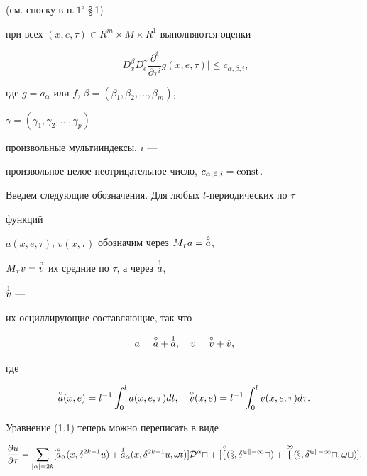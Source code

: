 (см. сноску в п.\,$1^\circ$ \S\,1) 


при всех $(x,e,\tau)\in R^m\times M\times R^1$ выполняются оценки 


\begin{equation} 


\bigg|D^\beta_x D^\gamma_e 


\frac{\partial^i}{\partial\tau^i}g(x,e,\tau)\bigg| 


\le c_{\alpha,\beta,i}, 


\end{equation} 


где $g=a_\alpha$ или $f$, $\beta=(\beta_1,\beta_2,\dotsc,\beta_m)$, 


$\gamma=(\gamma_1,\gamma_2,\dotsc,\gamma_p)$ --- 


произвольные мультииндексы, $i$ --- 


произвольное целое неотрицательное число, $c_{\alpha,\beta,i}=\operatorname{const}$. 


 


Введем следующие обозначения. Для любых $l$-периодических по $\tau$ 


функций 


$a(x,e,\tau)$, $v(x,\tau)$ обозначим через $M_\tau a=\overset{\circ}{a}{}$, 


$M_\tau v=\overset{\circ}{v}{}$ их средние по $\tau$, а через $\overset{1}{a}{}$, 


$\overset{1}{v}{}$ --- 


их осциллирующие составляющие, так что 


$$ 


a=\up{\circ}{a}+\up{1}{a},\quad 


v=\up{\circ}{v}+\up{1}{v}, 


$$ 


где 


$$ 


\up{\circ}{a}(x,e)=l^{-1}\int^l_0 a(x,e,\tau)dt,\quad 


\up{\circ}{v}(x,e)=l^{-1}\int^l_0 v(x,e,\tau)d\tau. 


$$ 


 


Уравнение (1.1) теперь можно переписать в виде 


\begin{equation} 


\frac{\partial u}{\partial\tau}=\sum_{|\alpha|=2k} 


[\up{\circ}{a}_\alpha(x,\delta^{2k-1}u)+ 


\up{1}{a}_\alpha(x,\delta^{2k-1}u,\omega t)] 


\cal D^\alpha u+[\up{\,\circ}{f}(x,\delta^{2k-1}u)+ 


\up{\,1}{f}(x,\delta^{2k-1}u,\omega t)]. 


\end{equation} 


